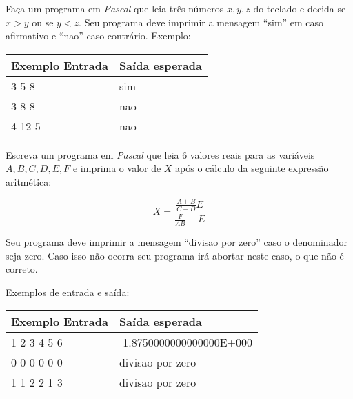 \item Faça um programa em \emph{Pascal} que leia três números $x, y, z$ 
do teclado e decida se $x > y$ ou se $y < z$. 
Seu programa deve imprimir a mensagem ``sim'' em caso afirmativo e  
``nao'' caso contrário. Exemplo:

\begin{center}
\begin{tabular}{|l|l|} \hline
Exemplo Entrada & Saída esperada \\ \hline
3 5 8                & sim                \\ \hline
3 8 8                & nao               \\ \hline
4 12 5               & nao               \\ \hline
\end{tabular}
\end{center}

\item Escreva um programa em \emph{Pascal} que leia
6 valores reais para as variáveis $A, B, C, D, E, F$ e
imprima o valor de $X$ após o cálculo
 da seguinte expressão aritmética:

     \[ X = \frac{\frac{A + B}{C - D}E}{\frac{F}{AB} + E} \]

Seu programa deve imprimir a mensagem ``divisao por zero''
caso o denominador seja zero. Caso isso não ocorra seu programa
irá abortar neste caso, o que não é correto.

Exemplos de entrada e saída:

\begin{center}
\begin{tabular}{|l|l|} \hline
Exemplo Entrada & Saída esperada \\ \hline
1 2 3 4 5 6     & -1.8750000000000000E+000  \\ \hline
0 0 0 0 0 0     & divisao por zero   \\ \hline
1 1 2 2 1 3     & divisao por zero   \\ \hline
\end{tabular}
\end{center}

